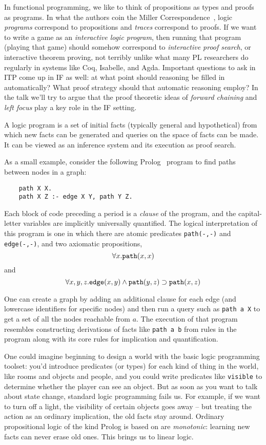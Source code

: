\renewcommand{\implies}{\supset}

In functional programming, we like to think of propositions as
types and proofs as programs. In what the authors coin the Miller
Correspondence~\cite{millertalk}, logic {\em programs} correspond to propositions
and {\em traces} correspond to proofs. If we want to write a game as an
{\em interactive logic program}, then running that program (playing that
game) should somehow correspond to {\em interactive proof search}, or
interactive theorem proving, not terribly unlike what many PL researchers
do regularly in systems like Coq, Isabelle, and Agda. Important questions
to ask in ITP come up in IF as well: at what point should reasoning be
filled in automatically? What proof strategy should that automatic
reasoning employ? In the talk we'll try to argue that the proof theoretic
ideas of {\em forward chaining} and {\em left focus} play a key role in the
IF setting.

A logic program is a set of initial facts (typically general and
hypothetical) from which new facts can be generated and queries on the
space of facts can be made. It can be viewed as an inference system and its
execution as proof search.

As a small example, consider the following
Prolog~\cite{Covington:1996:PPD:230996} program to
find paths between nodes in a graph:

\begin{verbatim}
    path X X.
    path X Z :- edge X Y, path Y Z.
\end{verbatim}

Each block of code preceding a period is a {\em clause} of the program, and
the capital-letter variables are implicitly universally quantified.
The logical interpretation of this program is one in which there are atomic
predicates \verb|path(-,-)| and \verb|edge(-,-)|, and two axiomatic
propositions, 
\[\forall x.\verb|path|(x, x)\] 
and 
\[\forall x,y,z.\verb|edge|(x, y) \land \verb|path|(y, z) \implies 
\verb|path|(x, z)\]

One can create a graph by adding an additional clause for each edge (and
lowercase identifiers for specific nodes) and then run a query such as
\verb|path a X| to get a set of all the nodes reachable from $a$. The
execution of that program resembles constructing derivations of facts like
\verb|path a b| from rules in the program along with its core rules for
implication and quantification.

One could imagine beginning to design a world with the basic logic
programming toolset: you'd introduce predicates (or types) for each kind of
thing in the world, like rooms and objects and people, and you could write
predicates like \verb|visible| to determine whether the player can see an
object. But as soon as you want to talk about state change, standard logic
programming fails us. For example, if we want to turn off a light, the
visibility of certain objects goes away -- but treating the action as an
ordinary implication, the old facts stay around. Ordinary propositional
logic of the kind Prolog is based on are {\em monotonic}: learning new
facts can never erase old ones. This brings us to linear logic.

